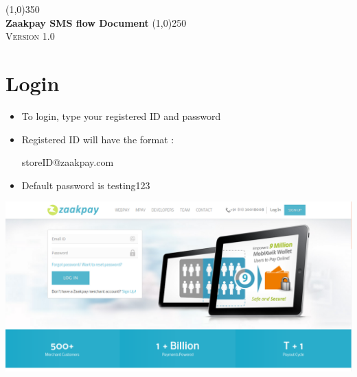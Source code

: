 \documentclass{article}
\begin{document}
\begin{titlepage}
\begin{center}
\line(1,0){350}\\
\huge{\bfseries Zaakpay SMS flow Document}
\line(1,0){250}\\
[1.5cm]
\textsc{\Large Version 1.0}
\end{center}


\end{titlepage}
\section{Login}

\begin{itemize}
\item To login, type your registered ID and password
\item Registered ID will have the format :

storeID@zaakpay.com
\item Default password is testing123
\end{itemize}
\includegraphics[width=6.5 in,height=4.4 in]{Login.png}
\newpage
\end{document}
